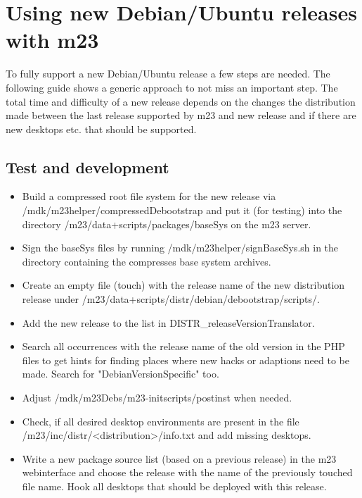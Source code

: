 \section{Using new Debian/Ubuntu releases with m23}
To fully support a new Debian/Ubuntu release a few steps are needed. The following guide shows a generic approach to not miss an important step. The total time and difficulty of a new release depends on the changes the distribution made between the last release supported by m23 and new release and if there are new desktops etc. that should be supported.

\subsection{Test and development}
\begin{itemize}
\item Build a compressed root file system for the new release via /mdk/m23helper/compressedDebootstrap and put it (for testing) into the directory /m23/data+scripts/packages/baseSys on the m23 server.

\item Sign the baseSys files by running /mdk/m23helper/signBaseSys.sh in the directory containing the compresses base system archives.

\item Create an empty file (touch) with the release name of the new distribution release under /m23/data+scripts/distr/debian/debootstrap/scripts/.

\item Add the new release to the list in DISTR_releaseVersionTranslator.

\item Search all occurrences with the release name of the old version in the PHP files to get hints for finding places where new hacks or adaptions need to be made. Search for "DebianVersionSpecific" too.

\item Adjust /mdk/m23Debs/m23-initscripts/postinst when needed.

\item Check, if all desired desktop environments are present in the file /m23/inc/distr/<distribution>/info.txt and add missing desktops.

\item Write a new package source list (based on a previous release) in the m23 webinterface and choose the release with the name of the previously touched file name. Hook all desktops that should be deployed with this release.


\end{itemize}
